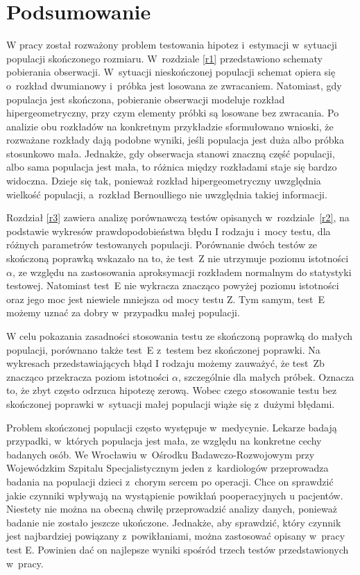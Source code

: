 \chapter*{Podsumowanie}

W pracy został rozważony problem testowania hipotez i~estymacji w~sytuacji populacji skończonego rozmiaru. W~rozdziale \ref{r1} przedstawiono schematy pobierania obserwacji. W~sytuacji nieskończonej populacji schemat opiera się o~rozkład dwumianowy i~próbka jest losowana ze zwracaniem. Natomiast, gdy populacja jest skończona, pobieranie obserwacji modeluje rozkład hipergeometryczny, przy czym elementy próbki są losowane bez zwracania. Po analizie obu rozkładów na konkretnym przykładzie sformułowano wnioski, że rozważane rozkłady dają podobne wyniki, jeśli populacja jest duża albo próbka stosunkowo mała. Jednakże, gdy obserwacja stanowi znaczną część populacji, albo sama populacja jest mała, to różnica między rozkładami staje się bardzo widoczna. Dzieje się tak, ponieważ rozkład hipergeometryczny uwzględnia wielkość populacji, a~rozkład Bernoulliego nie uwzględnia takiej informacji.

Rozdział \ref{r3} zawiera analizę porównawczą testów opisanych w~rozdziale~\ref{r2}, na podstawie wykresów prawdopodobieństwa błędu I rodzaju i~mocy testu, dla różnych parametrów testowanych populacji. Porównanie dwóch testów ze skończoną poprawką wskazało na to, że test~Z nie utrzymuje poziomu istotności $\alpha$, ze względu na zastosowania aproksymacji rozkładem normalnym do statystyki testowej. Natomiast test~E nie wykracza znacząco powyżej poziomu istotności oraz jego moc jest niewiele mniejsza od mocy testu Z. Tym samym, test~E możemy uznać za dobry w~przypadku małej populacji.

W celu pokazania zasadności stosowania testu ze skończoną poprawką do małych populacji, porównano także test~E z~testem bez skończonej poprawki. Na wykresach przedstawiających błąd I rodzaju możemy zauważyć, że test~Zb znacząco przekracza poziom istotności $\alpha$, szczególnie dla małych próbek. Oznacza to, że zbyt często odrzuca hipotezę zerową. Wobec czego stosowanie testu bez skończonej poprawki w~sytuacji małej populacji wiąże się z~dużymi błędami.

Problem skończonej populacji często występuje w~medycynie. Lekarze badają przypadki, w~których populacja jest mała, ze względu na konkretne cechy badanych osób. We Wrocławiu w~Ośrodku Badawczo-Rozwojowym przy Wojewódzkim Szpitalu Specjalistycznym jeden z~kardiologów przeprowadza badania na populacji dzieci z~chorym sercem po operacji. Chce on sprawdzić jakie czynniki wpływają na wystąpienie powikłań pooperacyjnych u pacjentów. Niestety nie można na obecną chwilę przeprowadzić analizy danych, ponieważ badanie nie zostało jeszcze ukończone. Jednakże, aby sprawdzić, który czynnik jest najbardziej powiązany z~powikłaniami, można zastosować opisany w~pracy test E. Powinien dać on najlepsze wyniki spośród trzech testów przedstawionych w~pracy.